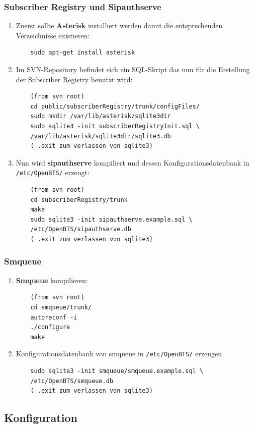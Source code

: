 \subsubsection{Subscriber Registry und Sipauthserve}
\begin{enumerate}
	\item Zuerst sollte \textbf{Asterisk} installiert werden damit die entsprechenden Verzeichnisse existieren:
	\begin{verbatim}
	sudo apt-get install asterisk
	\end{verbatim}
	\item Im SVN-Repository befindet sich ein SQL-Skript das nun für die Erstellung der Subscriber Registry benutzt wird:
	\begin{verbatim}
	(from svn root)
	cd public/subscriberRegistry/trunk/configFiles/
	sudo mkdir /var/lib/asterisk/sqlite3dir
	sudo sqlite3 -init subscriberRegistryInit.sql \
	/var/lib/asterisk/sqlite3dir/sqlite3.db
	( .exit zum verlassen von sqlite3)
	\end{verbatim}
	\item Nun wird \textbf{sipauthserve} kompiliert und dessen Konfigurationsdatenbank in \verb|/etc/OpenBTS/| erzeugt:
	\begin{verbatim}
	(from svn root)
	cd subscriberRegistry/trunk
	make
	sudo sqlite3 -init sipauthserve.example.sql \
	/etc/OpenBTS/sipauthserve.db
	( .exit zum verlassen von sqlite3)
	\end{verbatim}
\end{enumerate}

\subsubsection{Smqueue}
\begin{enumerate}
	\item \textbf{Smqueue} kompilieren:
	\begin{verbatim}
	(from svn root)
	cd smqueue/trunk/
	autoreconf -i
	./configure
	make
	\end{verbatim}
	\item Konfigurationsdatenbank von smqueue in \verb|/etc/OpenBTS/| erzeugen
	\begin{verbatim}
	sudo sqlite3 -init smqueue/smqueue.example.sql \
	/etc/OpenBTS/smqueue.db
	( .exit zum verlassen von sqlite3)
  \end{verbatim} 
\end{enumerate}

\subsection{Konfiguration}
\label{sec:Konfiguration}

